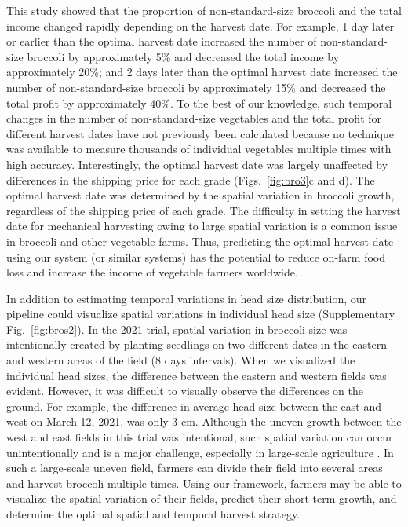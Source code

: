 This study showed that the proportion of non-standard-size broccoli and the total income changed rapidly depending on the harvest date. For example, 1 day later or earlier than the optimal harvest date increased the number of non-standard-size broccoli by approximately 5\% and decreased the total income by approximately 20\%; and 2 days later than the optimal harvest date increased the number of non-standard-size broccoli by approximately 15\% and decreased the total profit by approximately 40\%. To the best of our knowledge, such temporal changes in the number of non-standard-size vegetables and the total profit for different harvest dates have not previously been calculated because no technique was available to measure thousands of individual vegetables multiple times with high accuracy. Interestingly, the optimal harvest date was largely unaffected by differences in the shipping price for each grade (Figs.~\ref{fig:bro3}c and d). The optimal harvest date was determined by the spatial variation in broccoli growth, regardless of the shipping price of each grade. The difficulty in setting the harvest date for mechanical harvesting owing to large spatial variation is a common issue in broccoli and other vegetable farms. Thus, predicting the optimal harvest date using our system (or similar systems) has the potential to reduce on-farm food loss and increase the income of vegetable farmers worldwide.

In addition to estimating temporal variations in head size distribution, our pipeline could visualize spatial variations in individual head size (Supplementary Fig.~\ref{fig:bros2}). In the 2021 trial, spatial variation in broccoli size was intentionally created by planting seedlings on two different dates in the eastern and western areas of the field (8 days intervals). When we visualized the individual head sizes, the difference between the eastern and western fields was evident. However, it was difficult to visually observe the differences on the ground. For example, the difference in average head size between the east and west on March 12, 2021, was only 3 cm. Although the uneven growth between the west and east fields in this trial was intentional, such spatial variation can occur unintentionally and is a major challenge, especially in large-scale agriculture \citep{quine_investigation_2002}. In such a large-scale uneven field, farmers can divide their field into several areas and harvest broccoli multiple times. Using our framework, farmers may be able to visualize the spatial variation of their fields, predict their short-term growth, and determine the optimal spatial and temporal harvest strategy.


